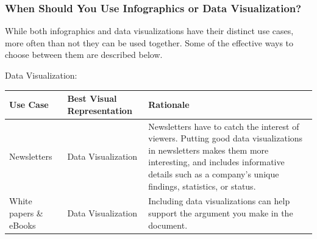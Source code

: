 \documentclass[]{book}
\begin{document}
\hypertarget{when-should-you-use-infographics-or-data-visualization}{%
\subsubsection{When Should You Use Infographics or Data Visualization?}\label{when-should-you-use-infographics-or-data-visualization}}

While both infographics and data visualizations have their distinct use cases, more often than not they can be used together. Some of the effective ways to choose between them are described below.

Data Visualization:

\begin{longtable}[]{@{}lll@{}}
\toprule
\begin{minipage}[b]{0.13\columnwidth}\raggedright
Use Case\strut
\end{minipage} & \begin{minipage}[b]{0.18\columnwidth}\raggedright
Best Visual Representation\strut
\end{minipage} & \begin{minipage}[b]{0.60\columnwidth}\raggedright
Rationale\strut
\end{minipage}\tabularnewline
\midrule
\endhead
\begin{minipage}[t]{0.13\columnwidth}\raggedright
Newsletters\strut
\end{minipage} & \begin{minipage}[t]{0.18\columnwidth}\raggedright
Data Visualization\strut
\end{minipage} & \begin{minipage}[t]{0.60\columnwidth}\raggedright
Newsletters have to catch the interest of viewers. Putting good data visualizations in newsletters makes them more interesting, and includes informative details such as a company's unique findings, statistics, or status.\strut
\end{minipage}\tabularnewline
\begin{minipage}[t]{0.13\columnwidth}\raggedright
White papers \& eBooks\strut
\end{minipage} & \begin{minipage}[t]{0.18\columnwidth}\raggedright
Data Visualization\strut
\end{minipage} & \begin{minipage}[t]{0.60\columnwidth}\raggedright
Including data visualizations can help support the argument you make in the document.\strut
\end{minipage}\tabularnewline

\end{longtable}
\end{document}
